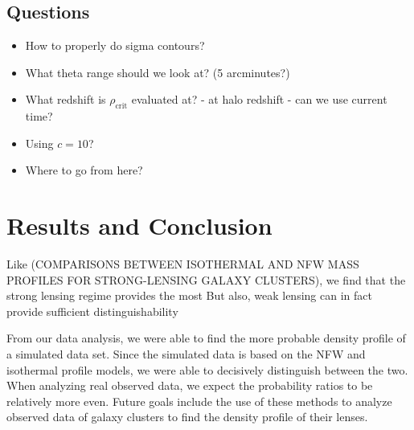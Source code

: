 \documentclass[10pt]{article}
\begin{document}
\subsection{Questions}
\begin{itemize}
    \item How to properly do sigma contours?
    \item What theta range should we look at? (5 arcminutes?)
    \item What redshift is $\rho_\mathrm{crit}$ evaluated at? - at halo redshift - can we use current time?
    \item Using $c = 10$?
    \item Where to go from here?
\end{itemize}


\section{Results and Conclusion}


Like (COMPARISONS BETWEEN ISOTHERMAL AND NFW MASS PROFILES
FOR STRONG-LENSING GALAXY CLUSTERS), we find that the strong lensing regime provides the most
But also, weak lensing can in fact provide sufficient distinguishability


From our data analysis, we were able to find the more probable density profile of a simulated data set.
Since the simulated data is based on the NFW and isothermal profile models, we were able to decisively distinguish between the two.
When analyzing real observed data, we expect the probability ratios to be relatively more even.
Future goals include the use of these methods to analyze observed data of galaxy clusters to find the density profile of their lenses.



\end{document}
